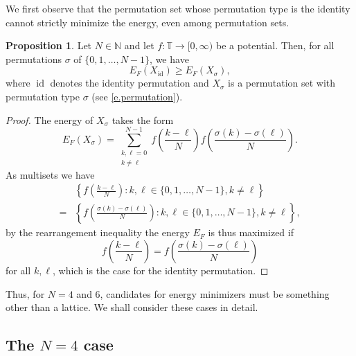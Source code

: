\documentclass[a4paper,12pt]{article}
\numberwithin{equation}{section}
\theoremstyle{definition}
\newtheorem{prop}[thm]{Proposition}
\newcommand{\bbN}{\mathbb{N}}
\newcommand{\bbT}{\mathbb{T}}
\newcommand{\id}{\operatorname{id}}
\begin{document}
We first observe that the permutation set whose permutation type is the identity cannot strictly minimize the  energy, even among permutation sets. 


\begin{prop} \label{prop:id}
    Let $N \in \bbN$ and let $f: \bbT \rightarrow [0, \infty)$ be a potential. 
    Then, for all permutations $\sigma$ of $\{0, 1, \dots, N-1\}$,
     we have
    $$
    E_F(X_{\id}) \geq E_F(X_\sigma),
    $$
    where $\id$ denotes the identity permutation and $X_\sigma$ is a permutation set with permutation type $\sigma$
     (see \eqref{e.permutation}).
\end{prop}


\begin{proof}
    The energy of $X_\sigma$ takes the form
    $$
    E_F(X_\sigma) = \sum_{\substack{k, \ell = 0 \\ k \neq \ell}}^{N-1} f\left(\frac{k-\ell}N\right) f\left(\frac{\sigma(k)-\sigma(\ell)}N\right).
    $$
    As multisets we have
    \begin{align*}
        & \left\{f\left(\frac{k-\ell}N\right): k, \ell \in \{0, 1, \dots, N-1\}, k \neq \ell\right\} \\
        = & \left\{f\left(\frac{\sigma(k)-\sigma(\ell)}N\right): k, \ell \in \{0, 1, \dots, N-1\}, k \neq \ell\right\},
    \end{align*}
    by the rearrangement inequality \cite{HLP88} the energy $E_F$ is thus maximized if
    $$
    f\left(\frac{k-\ell}N\right) = f\left(\frac{\sigma(k)-\sigma(\ell)}N\right)
    $$
    for all $k, \ell$, which is the case for the identity permutation.
\end{proof}

Thus, for $N=4$ and $6$, candidates for energy minimizers must be something other than a lattice. We shall consider these cases in detail. %

\subsection{The $N=4$ case}
\end{document}

